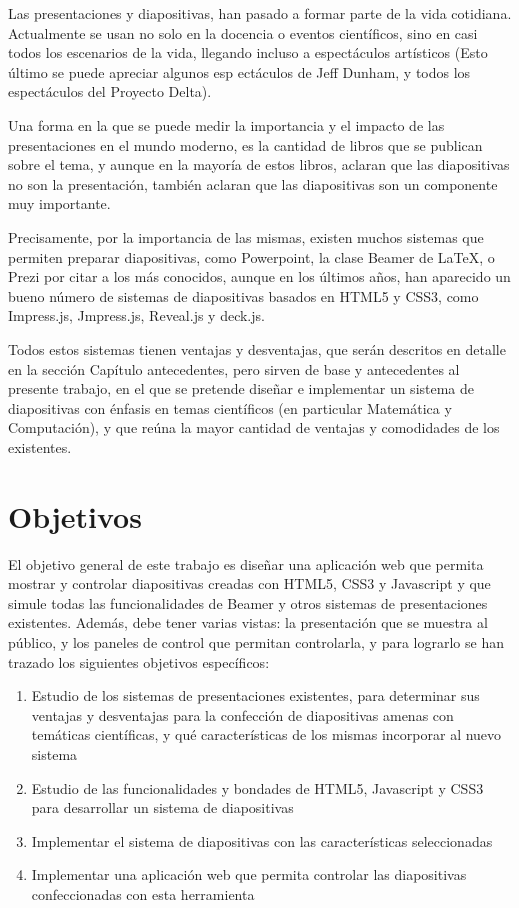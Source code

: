 
\begin{introduction}

	Las presentaciones y diapositivas, han pasado a formar parte de la vida cotidiana. Actualmente se usan no solo en la docencia o eventos científicos, sino en casi todos los escenarios de la vida, llegando incluso a espectáculos artísticos (Esto último se puede apreciar algunos esp ectáculos de Jeff Dunham, y todos los espectáculos del Proyecto Delta).


	Una forma en la que se puede medir la importancia y el impacto de las presentaciones en el mundo moderno, es la cantidad de libros que se publican sobre el tema, y aunque en la mayoría de estos libros, aclaran que las diapositivas no son la presentación, también aclaran que las diapositivas son un componente muy importante.


	Precisamente, por la importancia de las mismas, existen muchos sistemas que permiten preparar diapositivas, como Powerpoint, la clase Beamer de \LaTeX, o Prezi por citar a los más conocidos, aunque en los últimos años, han aparecido un bueno número de sistemas de diapositivas basados en HTML5 y CSS3, como Impress.js, Jmpress.js, Reveal.js y deck.js.


	Todos estos sistemas tienen ventajas y desventajas, que serán descritos en detalle en la sección Capítulo antecedentes, pero sirven de base y antecedentes al presente trabajo, en el que se pretende diseñar e implementar un sistema de diapositivas con énfasis en temas científicos (en particular Matemática y Computación), y que reúna la mayor cantidad de ventajas y comodidades de los existentes.

	\section*{Objetivos}

		El objetivo general de este trabajo es diseñar una aplicación web que permita mostrar y controlar diapositivas creadas con HTML5, CSS3 y Javascript y que simule todas las funcionalidades de Beamer y otros sistemas de presentaciones existentes. Además, debe tener varias vistas: la presentación que se muestra al público, y los paneles de control que permitan controlarla, y para lograrlo se han trazado los siguientes objetivos específicos:

		\begin{enumerate}
			\item Estudio de los sistemas de presentaciones existentes, para determinar sus ventajas y desventajas para la confección de diapositivas amenas con temáticas científicas, y qué características de los mismas incorporar al nuevo sistema
			\item Estudio de las funcionalidades y bondades de HTML5, Javascript y CSS3 para desarrollar un sistema de diapositivas
			\item Implementar el sistema de diapositivas con las características seleccionadas
			\item Implementar una aplicación web que permita controlar las diapositivas confeccionadas con esta herramienta
		\end{enumerate}


\end{introduction}
